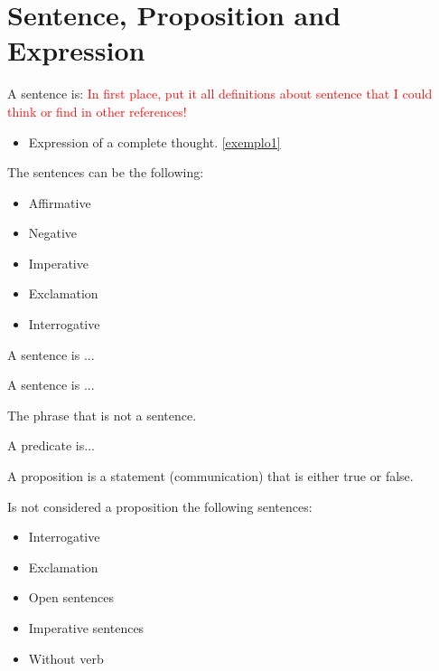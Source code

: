 \section{Sentence, Proposition and Expression}

\begin{definition}[Sentence]
    A sentence is: \textcolor{red}{In first place, put it all definitions about sentence that I could think or find in other references!}

    \begin{itemize}
        \item Expression of a complete thought. \ref{exemplo1}
    \end{itemize}

\end{definition}

The sentences can be the following:

\begin{itemize}
    \item Affirmative
    \item Negative
    \item Imperative
    \item Exclamation
    \item Interrogative
\end{itemize}

\begin{definition}
A sentence is ...


\end{definition}

\begin{definition}
A sentence is ...


\end{definition}

\begin{remark}[Expression]
    The phrase that is not a sentence.
\end{remark}

\begin{definition}[Predicate]
    A predicate is...
\end{definition}

\begin{definition}[Proposition]
A proposition is a statement (communication) that is either true or false.
\end{definition}

Is not considered a proposition the following sentences:

\begin{itemize}
    \item Interrogative
    \item Exclamation
    \item Open sentences
    \item Imperative sentences
    \item Without verb
\end{itemize}

